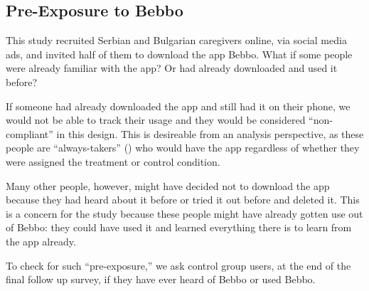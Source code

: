 \documentclass{article}
\begin{document}












\subsection*{Pre-Exposure to Bebbo}

This study recruited Serbian and Bulgarian caregivers online, via social media ads, and invited half of them to download the app Bebbo. What if some people were already familiar with the app? Or had already downloaded and used it before?

If someone had already downloaded the app and still had it on their phone, we would not be able to track their usage and they would be considered ``non-compliant'' in this design. This is desireable from an analysis perspective, as these people are ``always-takers'' (\cite{Imbens2015}) who would have the app regardless of whether they were assigned the treatment or control condition.

Many other people, however, might have decided not to download the app because they had heard about it before or tried it out before and deleted it. This is a concern for the study because these people might have already gotten use out of Bebbo: they could have used it and learned everything there is to learn from the app already.

To check for such ``pre-exposure,'' we ask control group users, at the end of the final follow up survey, if they have ever heard of Bebbo or used Bebbo.
\end{document}
